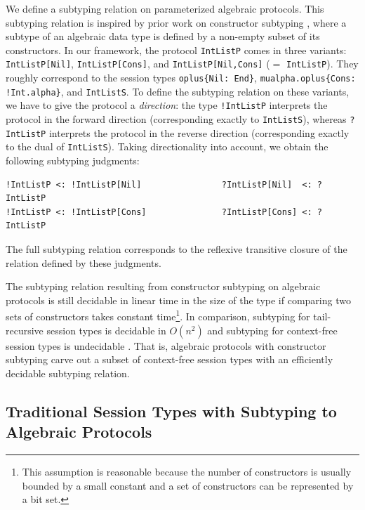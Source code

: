 We define a subtyping relation on parameterized algebraic
protocols. This subtyping relation is inspired by prior work on
constructor subtyping \cite{DBLP:conf/esop/BartheF99}, where a
subtype of an algebraic data type is defined by a non-empty subset of its
constructors. In our framework, the protocol \lstinline{IntListP} comes in
three variants: \lstinline{IntListP[Nil]}, \lstinline{IntListP[Cons]},
and \lstinline{IntListP[Nil,Cons]} ($=$ \lstinline{IntListP}). They roughly correspond to the
session types \lstinline|oplus{Nil: End}|,
\lstinline|mualpha.oplus{Cons: !Int.alpha}|, and
\lstinline{IntListS}. To define the subtyping relation on these
variants, we have to give the protocol a \emph{direction}: the type
\lstinline{!IntListP} interprets the protocol in the forward direction
(corresponding exactly to \lstinline{IntListS}), whereas
\lstinline{?IntListP} interprets the protocol in the reverse direction
(corresponding exactly to the dual of \lstinline{IntListS}). Taking
directionality into account, we obtain the following subtyping judgments:
\begin{lstlisting}
!IntListP <: !IntListP[Nil]                ?IntListP[Nil]  <: ?IntListP
!IntListP <: !IntListP[Cons]               ?IntListP[Cons] <: ?IntListP
\end{lstlisting}
The full subtyping relation corresponds to the reflexive transitive
closure of the relation defined by these judgments.

The subtyping relation resulting from constructor subtyping on algebraic protocols
is still decidable in linear time in the size of the type if comparing
two sets of constructors takes constant 
time\footnote{This assumption is reasonable because the number of
  constructors is usually bounded by a small constant and a set of
  constructors can be represented by a bit set.}. In comparison,
subtyping for tail-recursive session types is decidable in $O(n^2)$ and
subtyping for context-free session types is undecidable
\cite{DBLP:journals/toplas/Padovani19}. That is, 
algebraic protocols with constructor subtyping carve out a subset of
context-free session types with an efficiently decidable subtyping relation.

\subsection{Traditional Session Types with Subtyping to Algebraic Protocols}
\label{sec:trad-sess-types-1}


